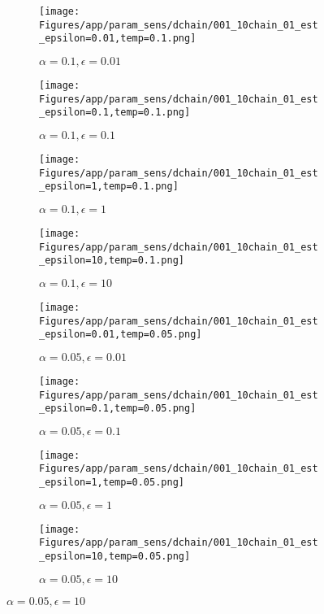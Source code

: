 \documentclass{article}
\theoremstyle{plain}
\begin{document}
\begin{appendices}
\begin{figure}
                \begin{subfigure}[b]{0.24\textwidth}
                    \centering
                    \texttt{[image: Figures/app/param\_sens/dchain/001\_10chain\_01\_est\_epsilon=0.01,temp=0.1.png]}
                    \caption*{$\alpha=0.1,\epsilon=0.01$}
                \end{subfigure}
                \begin{subfigure}[b]{0.24\textwidth}
                    \centering
                    \texttt{[image: Figures/app/param\_sens/dchain/001\_10chain\_01\_est\_epsilon=0.1,temp=0.1.png]}
                    \caption*{$\alpha=0.1,\epsilon=0.1$}
                \end{subfigure}
                \begin{subfigure}[b]{0.24\textwidth}
                    \centering
                    \texttt{[image: Figures/app/param\_sens/dchain/001\_10chain\_01\_est\_epsilon=1,temp=0.1.png]}
                    \caption*{$\alpha=0.1,\epsilon=1$}
                \end{subfigure}
                \begin{subfigure}[b]{0.24\textwidth}
                    \centering
                    \texttt{[image: Figures/app/param\_sens/dchain/001\_10chain\_01\_est\_epsilon=10,temp=0.1.png]}
                    \caption*{$\alpha=0.1,\epsilon=10$}
                \end{subfigure}
                
                \begin{subfigure}[b]{0.24\textwidth}
                    \centering
                    \texttt{[image: Figures/app/param\_sens/dchain/001\_10chain\_01\_est\_epsilon=0.01,temp=0.05.png]}
                    \caption*{$\alpha=0.05,\epsilon=0.01$}
                \end{subfigure}
                \begin{subfigure}[b]{0.24\textwidth}
                    \centering
                    \texttt{[image: Figures/app/param\_sens/dchain/001\_10chain\_01\_est\_epsilon=0.1,temp=0.05.png]}
                    \caption*{$\alpha=0.05,\epsilon=0.1$}
                \end{subfigure}
                \begin{subfigure}[b]{0.24\textwidth}
                    \centering
                    \texttt{[image: Figures/app/param\_sens/dchain/001\_10chain\_01\_est\_epsilon=1,temp=0.05.png]}
                    \caption*{$\alpha=0.05,\epsilon=1$}
                \end{subfigure}
                \begin{subfigure}[b]{0.24\textwidth}
                    \centering
                    \texttt{[image: Figures/app/param\_sens/dchain/001\_10chain\_01\_est\_epsilon=10,temp=0.05.png]}
                    \caption*{$\alpha=0.05,\epsilon=10$}
                \end{subfigure}
                

\end{figure}
\end{appendices}
\end{document}
